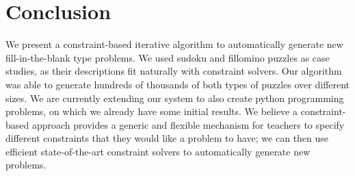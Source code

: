 \section{Conclusion}

We present a constraint-based iterative algorithm to automatically generate new fill-in-the-blank type problems. We used sudoku and fillomino puzzles as case studies, as their descriptions fit naturally with constraint solvers. Our algorithm was able to generate hundreds of thousands of both types of puzzles over different sizes. We are currently extending our system to also create python programming problems, on which we already have some initial results. We believe a constraint-based approach provides a generic and flexible mechanism for teachers to specify different constraints that they would like a problem to have; we can then use efficient state-of-the-art constraint solvers to automatically generate new problems.